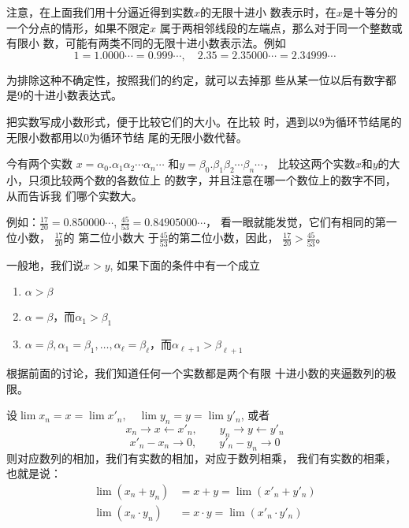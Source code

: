     注意，在上面我们用十分逼近得到实数$x$的无限十进小
    数表示时，在$x$是十等分的一个分点的情形，如果不限定$x$
    属于两相邻线段的左端点，那么对于同一个整数或有限小
    数，可能有两类不同的无限十进小数表示法。例如
\[1=1.0000\cdots=0.999\cdots,\quad 2.35=2.35000\cdots=2.34999\cdots\]

    为排除这种不确定性，按照我们的约定，就可以去掉那
    些从某一位以后有数字都是9的十进小数表达式。

把实数写成小数形式，便于比较它们的大小。在比较
时，遇到以9为循环节结尾的无限小数都用以0为循环节结
尾的无限小数代替。

今有两个实数
$x=\alpha_0.\alpha_1\alpha_2\cdots\alpha_n\cdots$ 和$y=\beta_0.\beta_1\beta_2\cdots\beta_n\cdots$，
比较这两个实数$x$和$y$的大小，只须比较两个数的各数位上
的数字，并且注意在哪一个数位上的数字不同，从而告诉我
们哪个实数大。


例如：$\frac{17}{20}=0.850000\cdots$, $\frac{45}{53}=0.84905000\cdots$，
看一眼就能发觉，它们有相同的第一位小数，
$\frac{17}{20}$的 第二位小数大
于$\frac{45}{53}$的第二位小数，因此，
$\frac{17}{20}>\frac{45}{53}$。

一般地，我们说$x>y$, 如果下面的条件中有一个成立
\begin{enumerate}
    \item $\alpha>\beta$
    \item $\alpha=\beta$，而$\alpha_1>\beta_1$
    \item $\alpha=\beta, \alpha_1 =\beta_1,\ldots,\alpha_{\ell}=\beta_{\ell}$，而$\alpha_{\ell+1}>\beta_{\ell+1}$
\end{enumerate}

根据前面的讨论，我们知道任何一个实数都是两个有限
十进小数的夹逼数列的极限。

设$\lim x_n=x=\lim x'_n,\quad \lim y_n=y=\lim y'_n$,
或者
\[x_n\to x\leftarrow x'_n,\qquad y_n\to y\leftarrow y'_n\]
\[x'_n-x_n\to 0,\qquad y'_n-y_n\to 0\]
则对应数列的相加，我们有实数的相加，对应于数列相乘，
我们有实数的相乘，也就是说：
\[\begin{split}
    \lim(x_n+y_n)&=x+y=\lim(x'_n+y'_n)\\
    \lim(x_n\cdot y_n)&=x\cdot y=\lim(x'_n\cdot y'_n)
\end{split}
\]

